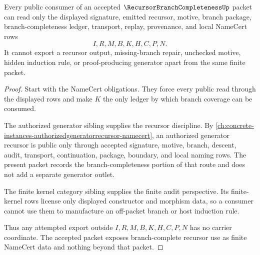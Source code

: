 \begin{theorem}
\label{thm:recursor-branch-completeness-nonescape}
Every public consumer of an accepted $\RecursorBranchCompletenessUp$ packet can read only the displayed signature, emitted recursor, motive, branch package, branch-completeness ledger, transport, replay, provenance, and local NameCert rows
$$
I,R,M,B,K,H,C,P,N.
$$
It cannot export a recursor output, missing-branch repair, unchecked motive, hidden induction rule, or proof-producing generator apart from the same finite packet.
\end{theorem}
\begin{proof}
Start with the NameCert obligations. They force every public read through the displayed rows and make $K$ the only ledger by which branch coverage can be consumed.

The authorized generator sibling supplies the recursor discipline. By \autoref{ch:concrete-instances-authorizedgeneratorrecursor-namecert}, an authorized generator recursor is public only through accepted signature, motive, branch, descent, audit, transport, continuation, package, boundary, and local naming rows. The present packet records the branch-completeness portion of that route and does not add a separate generator outlet.

The finite kernel category sibling supplies the finite audit perspective. Its finite-kernel rows license only displayed constructor and morphism data, so a consumer cannot use them to manufacture an off-packet branch or host induction rule.

Thus any attempted export outside $I,R,M,B,K,H,C,P,N$ has no carrier coordinate. The accepted packet exposes branch-complete recursor use as finite NameCert data and nothing beyond that packet.
\end{proof}



